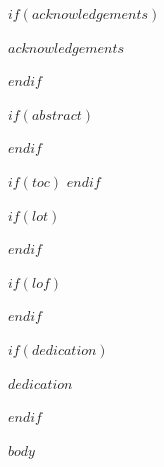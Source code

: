 \documentclass[12pt,a4paper]{reedthesis}
\begin{document}
\begin{titlepage}

\end{titlepage}

\addamargin %

\frontmatter %
\pagestyle{empty} %

$if(acknowledgements)$
  \begin{acknowledgements}
    $acknowledgements$
  \end{acknowledgements}
$endif$

$if(abstract)$
  \begin{abstract}
    $abstract$
  \end{abstract}
$endif$


$if(toc)$
  \hypersetup{linkcolor=$if(toccolor)$$toccolor$$else$black$endif$}
  \setcounter{secnumdepth}{$toc-depth$}
  \setcounter{tocdepth}{$toc-depth$}
  \tableofcontents
$endif$

$if(lot)$
  \listoftables
$endif$

$if(lof)$
  \listoffigures
$endif$

$if(dedication)$
  \begin{dedication}
    $dedication$
  \end{dedication}
$endif$

\mainmatter %
\pagestyle{fancyplain} %

$body$


\newpage
\thispagestyle{empty}
\selectfont
\end{document}
